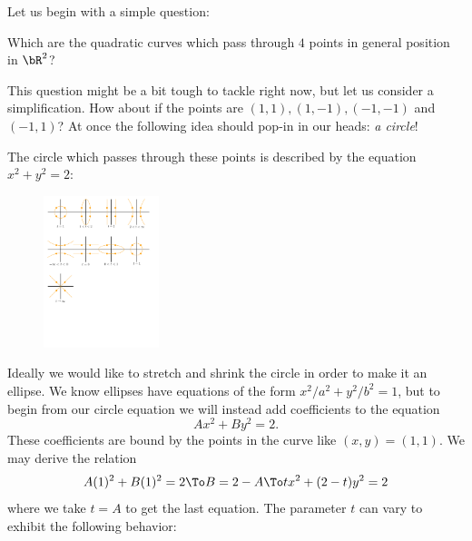 \documentclass[12pt]{memoir}
\begin{document}
Let us begin with a simple question:
\begin{significant}
Which are the quadratic curves which pass through $4$ points in general position in $\bR^2$?
\end{significant}
This question might be a bit tough to tackle right now, but let us consider a simplification. How about if the points are $(1,1),(1,-1),(-1,-1)$ and $(-1,1)$? At once the following idea should pop-in in our heads: \emph{a circle}!\par 
The circle which passes through these points is described by the equation $x^2+y^2=2$:\par
\begin{figure}[h]
    \centering
    \includegraphics[width=0.3\textwidth, trim= 0.8cm 22.9cm 16cm 0.6cm,clip]{fig1.pdf}
\end{figure}
Ideally we would like to stretch and shrink the circle in order to make it an ellipse. We know ellipses have equations of the form $x^2/a^2+y^2/b^2=1$, but to begin from our circle equation we will instead add coefficients to the equation 
$$Ax^2+By^2=2.$$
These coefficients are bound by the points in the curve like $(x,y)=(1,1)$. We may derive the relation 
$$A(1)^2+B(1)^2=2\To B=2-A\To tx^2+(2-t)y^2=2$$
where we take $t=A$ to get the last equation.
The parameter $t$ can vary to exhibit the following behavior:\par
\end{document}
